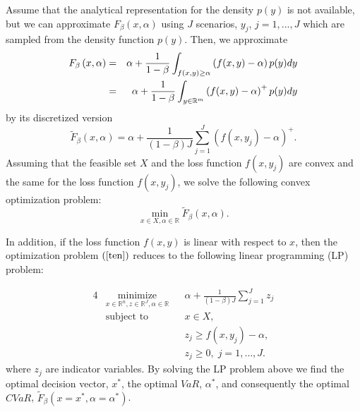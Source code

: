 \documentclass[a4paper,10pt]{article}
\begin{document}
Assume that the analytical representation for the density $p(y)$ is not
available, but we can approximate $F_{\beta }\left( x,\alpha \right) $ using
$J$ scenarios, $y_{j}$, $j=1,...,J$ which are sampled from the density
function $p(y)$. Then, we approximate
\begin{eqnarray}
F_{\beta }\left( x,\alpha \right) &=&\alpha +\frac{1}{1-\beta }%
\int_{f(x,y)\geq \alpha }\left( f(x,y)-\alpha \right) p(y)dy  \notag \\
&=&\alpha +\frac{1}{1-\beta }\int_{y\in
	\mathbb{R}
	^{m}}\left( f(x,y)-\alpha \right) ^{+}p(y)dy  \label{fb}
\end{eqnarray}%
by its discretized version
\begin{equation*}
\widetilde{F}_{\beta }\left( x,\alpha \right) =\alpha +\frac{1}{\left(
	1-\beta \right) J}\sum_{j=1}^{J}\left( f(x,y_{j})-\alpha \right) ^{+}.
\end{equation*}%
Assuming that the feasible set $X$ and the loss
function $f(x,y_{j})$ are convex and the same for the loss
function $f(x,y_{j})$, we solve the following convex optimization problem:
\begin{equation}
\underset{x\in X,\alpha \in
	\mathbb{R}
}{\min }\widetilde{F}_{\beta }\left( x,\alpha \right) .  \label{ten}
\end{equation}

In addition, if the loss function $f(x,y)$ is linear with respect to
\thinspace $x$, then the optimization problem $\left( \ref{ten}\right) $
reduces to the following linear programming (LP) problem:%

\begin{alignat}{4}
& \underset{x \in \mathbb{R}^{n},z\in 	\mathbb{R}^{J},\alpha \in \mathbb{R}}{\text{minimize}}
& & \alpha +\frac{1}{\left( 1-\beta \right)  J}\sum_{j=1}^{J}z_{j}
\\ 
& \text{subject to} 
& & x\in X,\\
&&& z_{j}\geq f(x,y_{j})-\alpha , \\
&&& z_{j}\geq 0, \; j = 1, \ldots, J.
\end{alignat}
where $z_{j}$ are indicator variables. By solving the LP problem above we
find the optimal decision vector, $x^{\ast }$, the optimal $VaR$, $\alpha
^{\ast }$, and consequently the optimal $CVaR$, $\widetilde{F}_{\beta
}\left( x=x^{\ast },\alpha=\alpha ^{\ast }\right) $.
\end{document}
